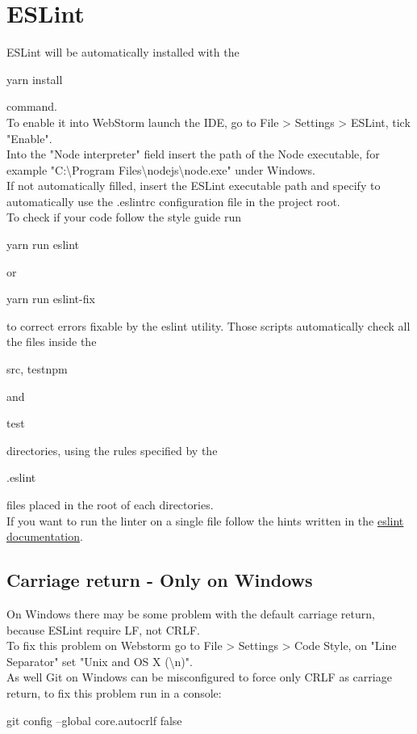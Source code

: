 \documentclass[ManualeSviluppatore.tex]{subfiles}
\begin{document}
\section{ESLint}
ESLint will be automatically installed with the \begin{ttfamily}yarn install \end{ttfamily}command. \\
To enable it into WebStorm launch the IDE, go to File \textgreater{} Settings \textgreater{} ESLint, tick "Enable". \\
Into the "Node interpreter" field insert the path of the Node executable, for example "C:\textbackslash Program Files\textbackslash nodejs\textbackslash node.exe" under Windows. \\
If not automatically filled, insert the ESLint executable path and specify to automatically use the .eslintrc configuration file in the project root.\\
To check if your code follow the style guide run \begin{ttfamily}yarn run eslint\end{ttfamily} or \begin{ttfamily} yarn run eslint-fix\end{ttfamily} to correct errors fixable by the eslint utility.
Those scripts automatically check all the files inside the \begin{ttfamily}src, testnpm\end{ttfamily} and \begin{ttfamily}test\end{ttfamily} directories, using the rules specified by the \begin{ttfamily}.eslint\end{ttfamily} files placed in the root of each directories.\\
If you want to run the linter on a single file follow the hints written in the \href{https://eslint.org/docs/user-guide/getting-started}{eslint documentation}.

\subsection{Carriage return - Only on Windows}
On Windows there may be some problem with the default carriage return, because ESLint require LF, not CRLF. \\
To fix this problem on Webstorm go to File \textgreater{} Settings \textgreater{} Code Style, on "Line Separator" set "Unix and OS X (\textbackslash{}n)". \\
As well Git on Windows can be misconfigured to force only CRLF as carriage return, to fix this problem run in a console: \\
\begin{ttfamily}git config --global core.autocrlf false \end{ttfamily}
\end{document}
